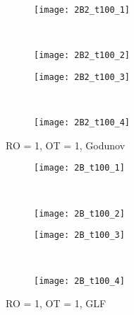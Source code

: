 \documentclass[10pt,letterpaper,fleqn]{article}
\begin{document}
\begin{figure}[h!]
        \centering
        \begin{subfigure}[b]{0.4\textwidth}
                \texttt{[image: 2B2\_t100\_1]}
        \end{subfigure}%
        ~ 
        \begin{subfigure}[b]{0.4\textwidth}
                \texttt{[image: 2B2\_t100\_2]}
        \end{subfigure}
        
        \begin{subfigure}[b]{0.4\textwidth}
                \texttt{[image: 2B2\_t100\_3]}
        \end{subfigure}
        ~
        \begin{subfigure}[b]{0.4\textwidth}
                \texttt{[image: 2B2\_t100\_4]}
        \end{subfigure}
        \caption{RO = 1, OT = 1, Godunov}
\end{figure}

\begin{figure}[h!]
        \centering
        \begin{subfigure}[b]{0.4\textwidth}
                \texttt{[image: 2B\_t100\_1]}
        \end{subfigure}%
        ~ 
        \begin{subfigure}[b]{0.4\textwidth}
                \texttt{[image: 2B\_t100\_2]}
        \end{subfigure}
        
        \begin{subfigure}[b]{0.4\textwidth}
                \texttt{[image: 2B\_t100\_3]}
        \end{subfigure}
        ~
        \begin{subfigure}[b]{0.4\textwidth}
                \texttt{[image: 2B\_t100\_4]}
        \end{subfigure}
        \caption{RO = 1, OT = 1, GLF}
\end{figure}
\pagebreak


\thispagestyle{fancy}
\end{document}
